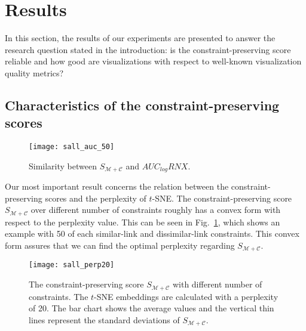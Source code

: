 \section{Results}\label{sec:results}
In this section, the results of our experiments are presented to answer the research question stated in the introduction: is the constraint-preserving score reliable and how good are visualizations with respect to well-known visualization quality metrics?

\subsection{Characteristics of the constraint-preserving scores}\label{subsec:result_s_score}

\begin{figure}
  \centering
  \texttt{[image: sall\_auc\_50]}
  \caption{Similarity between $S_{\mathcal{M}+\mathcal{C}}$ and $AUC_{log}RNX$.}
  \label{fig:compare_sall_auc}
\end{figure}

Our most important result concerns the relation between the constraint-preserving scores and the perplexity of $t$-SNE. 
The constraint-preserving score $S_{\mathcal{M}+\mathcal{C}}$ over different number of constraints roughly has a convex form with respect to the perplexity value. This can be seen in Fig.~\ref{fig:compare_sall_auc}, which shows an example with 50 of each similar-link and dissimilar-link constraints. This convex form assures that we can find the optimal perplexity regarding $S_{\mathcal{M}+\mathcal{C}}$.%

\begin{figure}
    \centering
    \texttt{[image: sall\_perp20]}
    \caption{The constraint-preserving score $S_{\mathcal{M}+\mathcal{C}}$ with different number of constraints. The $t$-SNE embeddings are calculated with a perplexity of 20. The bar chart shows the average values and the vertical thin lines represent the standard deviations of $S_{\mathcal{M}+\mathcal{C}}$.}
    \label{fig:s_nconstraint}
\end{figure}

